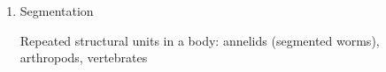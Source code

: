 \begin{frame}[t]
    \begin{adjustwidth}{-2em}{-1.5em}

        \begin{enumerate}
            \addtocounter{enumi}{4}

            \item Segmentation 

                \vspace{2mm}
                Repeated structural units in a body: annelids (segmented worms),
                arthropods, vertebrates
        \end{enumerate}


    \end{adjustwidth}
\end{frame}

